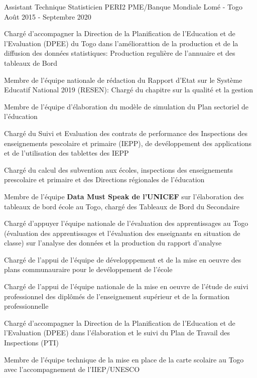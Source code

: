 \begin{cventries}
  \cventry
    {Assistant Technique Statisticien} %
    {PERI2 PME/Banque Mondiale} %
    {Lomé - Togo} %
    {Août 2015 - Septembre 2020} %
    {
      \begin{cvitems} %
        \item {Chargé d'accompagner la Direction de la Planification de l'Education et de l'Evaluation (DPEE) du Togo dans l'améliorattion de la production et de la diffusion des données statistiques: Production regulière de l'annuaire et des tableaux de Bord}
        \item {Membre de l'équipe nationale de rédaction du Rapport d'Etat sur le Système Educatif National 2019 (RESEN): Chargé du chapitre sur la qualité et la gestion }
        \item {Membre de l'équipe d'élaboration du modèle de simulation du Plan sectoriel de l'éducation}
    	  \item {Chargé du Suivi et Evaluation des contrats de performance des Inspections des enseignements pescolaire et primaire (IEPP), de devéloppement des applications et de l'utilisation des tablettes des IEPP}
    	  \item {Chargé du calcul des subvention aux écoles, inspections des enseignements prescolaire et primaire et des Directions régionales de l'éducation}
	  \item {Membre de l'équipe {\bf Data Must Speak de l'UNICEF} sur l'élaboration des tableaux de bord école au Togo, chargé des Tableaux de Bord du Secondaire}
	  \item {Chargé d'appuyer l'équipe nationale de l'évaluation des apprentissages au Togo (évaluation des apprentissages et l'évaluation des enseignants en situation de classe) sur l'analyse des données et la production du rapport d'analyse}
	 	 \item {Chargé de l'appui de l'équipe de développpement et de la mise en oeuvre des plans communauraire pour le devéloppement de l'école}
	 \item {Chargé de l'appui de l'équipe nationale de la mise en oeuvre de l'étude de suivi professionnel des diplômés de l'enseignement supérieur et de la formation professionnelle}
	  \item {Chargé d'accompagner la Direction de la Planification de l'Education et de l'Evaluation (DPEE) dans l'élaboration et le suivi du Plan de Travail des Inspections (PTI)}
	  \item {Membre de l'équipe technique de la mise en place de la carte scolaire au Togo avec l'accompagnement de l'IIEP/UNESCO}
      \end{cvitems}
    }


\end{cventries}
